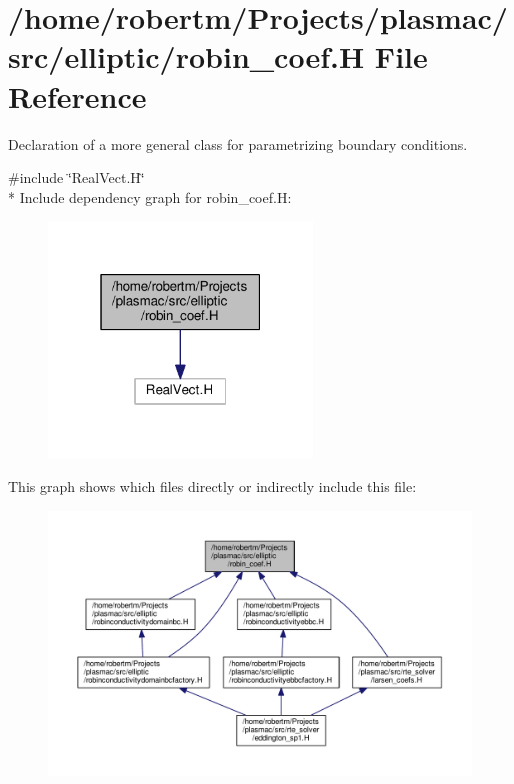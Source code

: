 \hypertarget{robin__coef_8H}{}\section{/home/robertm/\+Projects/plasmac/src/elliptic/robin\+\_\+coef.H File Reference}
\label{robin__coef_8H}


Declaration of a more general class for parametrizing boundary conditions.  


{\ttfamily \#include \char`\"{}Real\+Vect.\+H\char`\"{}}\\*
Include dependency graph for robin\+\_\+coef.\+H\+:\nopagebreak
\begin{figure}[H]
\begin{center}
\leavevmode
\includegraphics[width=199pt]{robin__coef_8H__incl}
\end{center}
\end{figure}
This graph shows which files directly or indirectly include this file\+:\nopagebreak
\begin{figure}[H]
\begin{center}
\leavevmode
\includegraphics[width=350pt]{robin__coef_8H__dep__incl}
\end{center}
\end{figure}
